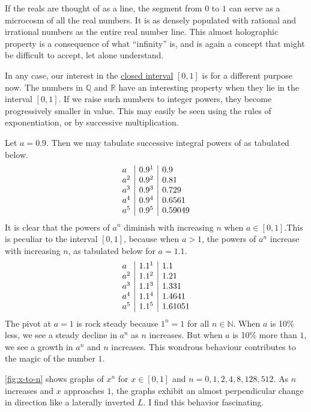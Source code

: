 \documentclass[
  a4paper,
]{article}
\begin{document}
If the reals are thought of as a line, the segment from \(0\) to \(1\)
can serve as a microcosm of all the real numbers. It is as densely
populated with rational and irrational numbers as the entire real number
line. This almost holographic property is a consequence of what
``infinity'' is, and is again a concept that might be difficult to
accept, let alone understand.

In any case, our interest in the
\href{https://mathworld.wolfram.com/ClosedInterval.html}{closed
interval} \([0, 1]\) is for a different purpose now. The numbers in
\(\mathbb{Q}\) and \(\mathbb{R}\) have an interesting property when they
lie in the interval \([0, 1]\). If we raise such numbers to integer
powers, they become progressively smaller in value. This may easily be
seen using the rules of exponentiation, or by successive multiplication.

Let \(a = 0.9\). Then we may tabulate successive integral powers of as
tabulated below. \[
\begin{array}{l | r | l}
a & 0.9^1 & 0.9\\
a^2 & 0.9^2 & 0.81\\
a^3 & 0.9^3 & 0.729\\
a^4 & 0.9^4 & 0.6561\\
a^5 & 0.9^5 & 0.59049\\
\end{array}
\] It is clear that the powers of \(a^n\) diminish with increasing \(n\)
when \(a \in [0, 1]\).This is peculiar to the interval \([0, 1]\),
because when \(a > 1\), the powers of \(a^n\) increase with increasing
\(n\), as tabulated below for \(a=1.1\). \[
\begin{array}{l | r | l}
a & 1.1^1 & 1.1\\
a^2 & 1.1^2 & 1.21\\
a^3 & 1.1^3 & 1.331\\
a^4 & 1.1^4 & 1.4641\\
a^5 & 1.1^5 & 1.61051\\
\end{array}
\] The pivot at \(a = 1\) is rock steady because \(1^n = 1\) for all
\(n \in \mathbb{N}\). When \(a\) is 10\% less, we see a steady decline
in \(a^n\) as \(n\) increases. But when \(a\) is 10\% more than \(1\),
we see a growth in \(a^n\) and \(n\) increases. This wondrous behaviour
contributes to the magic of the number \(1\).

\cref{fig:x-to-n} shows graphs of \(x^n\) for \(x \in [0, 1]\) and
\(n = 0, 1, 2, 4, 8, 128, 512\). As \(n\) increases and \(x\) approaches
\(1\), the graphs exhibit an almost perpendicular change in direction
like a laterally inverted \(L\). I find this behavior fascinating.
\end{document}
